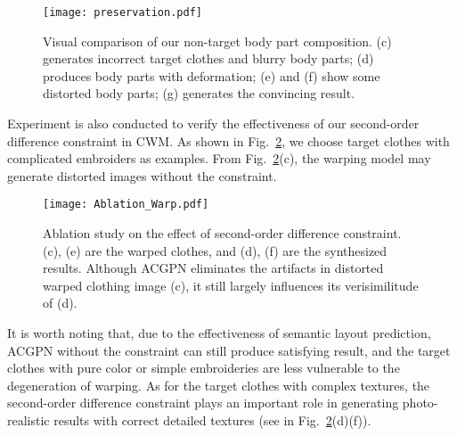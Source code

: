 \documentclass[10pt,twocolumn,letterpaper]{article}
\begin{document}
\begin{figure}[htb]
\begin{center}
\vspace{-5pt}
\texttt{[image: preservation.pdf]}
\vspace{-10pt}
\end{center}
   \caption{\footnotesize Visual comparison of our non-target body part composition. (c) generates incorrect target clothes and blurry body parts; (d) produces body parts with deformation; (e) and (f) show some distorted body parts; (g) generates the convincing result.}
\label{fig:preservation}
\vspace{-10pt}
\end{figure}



Experiment is also conducted to verify the effectiveness of our second-order difference constraint in CWM. As shown in Fig.~\ref{fig:AblationWarp}, we choose target clothes with complicated embroiders as examples.
From Fig.~\ref{fig:AblationWarp}(c), the warping model may generate distorted images without the constraint.

 
\begin{figure}[htb]
\begin{center}
\texttt{[image: Ablation\_Warp.pdf]}
\vspace{-10pt}
\end{center}
   \caption{\footnotesize Ablation study on the effect of second-order difference constraint. (c), (e) are the warped clothes, and (d), (f) are the synthesized results. Although ACGPN eliminates the artifacts in distorted warped clothing  image (c), it still largely influences its verisimilitude of (d). }
\label{fig:AblationWarp}
\vspace{-10pt}

\end{figure}


It is worth noting that, due to the effectiveness of semantic layout prediction, ACGPN without the constraint can still produce satisfying result, and the target clothes with pure color or simple embroideries are less vulnerable to the degeneration of warping.
As for the target clothes with complex textures, the second-order difference constraint plays an important role in generating photo-realistic results with correct detailed textures
(see in Fig.~\ref{fig:AblationWarp}(d)(f)).
\end{document}
